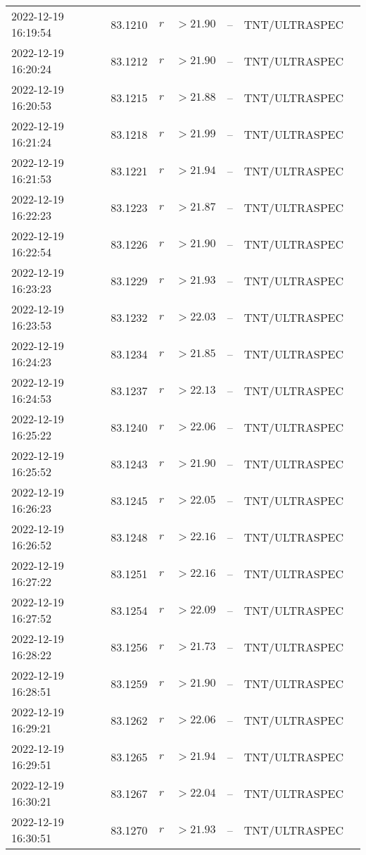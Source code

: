 \documentclass{nature_plusfigure}
\begin{document}
\begin{supplement}
\begin{center}
\begin{longtable}{lllllll}
2022-12-19 16:19:54 & 83.1210 & $r$ & $>21.90$ & -- & TNT/ULTRASPEC &  \\ 
2022-12-19 16:20:24 & 83.1212 & $r$ & $>21.90$ & -- & TNT/ULTRASPEC &  \\ 
2022-12-19 16:20:53 & 83.1215 & $r$ & $>21.88$ & -- & TNT/ULTRASPEC &  \\ 
2022-12-19 16:21:24 & 83.1218 & $r$ & $>21.99$ & -- & TNT/ULTRASPEC &  \\ 
2022-12-19 16:21:53 & 83.1221 & $r$ & $>21.94$ & -- & TNT/ULTRASPEC &  \\ 
2022-12-19 16:22:23 & 83.1223 & $r$ & $>21.87$ & -- & TNT/ULTRASPEC &  \\ 
2022-12-19 16:22:54 & 83.1226 & $r$ & $>21.90$ & -- & TNT/ULTRASPEC &  \\ 
2022-12-19 16:23:23 & 83.1229 & $r$ & $>21.93$ & -- & TNT/ULTRASPEC &  \\ 
2022-12-19 16:23:53 & 83.1232 & $r$ & $>22.03$ & -- & TNT/ULTRASPEC &  \\ 
2022-12-19 16:24:23 & 83.1234 & $r$ & $>21.85$ & -- & TNT/ULTRASPEC &  \\ 
2022-12-19 16:24:53 & 83.1237 & $r$ & $>22.13$ & -- & TNT/ULTRASPEC &  \\ 
2022-12-19 16:25:22 & 83.1240 & $r$ & $>22.06$ & -- & TNT/ULTRASPEC &  \\ 
2022-12-19 16:25:52 & 83.1243 & $r$ & $>21.90$ & -- & TNT/ULTRASPEC &  \\ 
2022-12-19 16:26:23 & 83.1245 & $r$ & $>22.05$ & -- & TNT/ULTRASPEC &  \\ 
2022-12-19 16:26:52 & 83.1248 & $r$ & $>22.16$ & -- & TNT/ULTRASPEC &  \\ 
2022-12-19 16:27:22 & 83.1251 & $r$ & $>22.16$ & -- & TNT/ULTRASPEC &  \\ 
2022-12-19 16:27:52 & 83.1254 & $r$ & $>22.09$ & -- & TNT/ULTRASPEC &  \\ 
2022-12-19 16:28:22 & 83.1256 & $r$ & $>21.73$ & -- & TNT/ULTRASPEC &  \\ 
2022-12-19 16:28:51 & 83.1259 & $r$ & $>21.90$ & -- & TNT/ULTRASPEC &  \\ 
2022-12-19 16:29:21 & 83.1262 & $r$ & $>22.06$ & -- & TNT/ULTRASPEC &  \\ 
2022-12-19 16:29:51 & 83.1265 & $r$ & $>21.94$ & -- & TNT/ULTRASPEC &  \\ 
2022-12-19 16:30:21 & 83.1267 & $r$ & $>22.04$ & -- & TNT/ULTRASPEC &  \\ 
2022-12-19 16:30:51 & 83.1270 & $r$ & $>21.93$ & -- & TNT/ULTRASPEC &  \\ 

\end{longtable}
\end{center}
\end{supplement}
\end{document}
